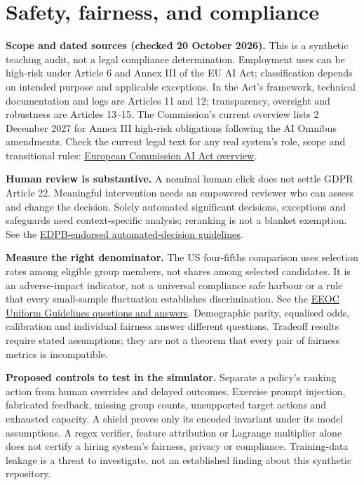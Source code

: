 \documentclass[11pt,oneside]{scrbook}
\begin{document}
\chapter{Safety, fairness, and compliance}

\begin{safetyangle}
\textbf{Scope and dated sources (checked 20 October 2026).}
This is a synthetic teaching audit, not a legal compliance determination.
Employment uses can be high-risk under Article 6 and Annex III of the EU AI
Act; classification depends on intended purpose and applicable exceptions.
In the Act's framework, technical documentation and logs are Articles 11
and 12; transparency, oversight and robustness are Articles 13--15.
The Commission's current overview lists 2 December 2027 for Annex III
high-risk obligations following the AI Omnibus amendments. Check the
current legal text for any real system's role, scope and transitional rules:
\href{https://digital-strategy.ec.europa.eu/en/policies/regulatory-framework-ai}{European Commission AI Act overview}.

\textbf{Human review is substantive.} A nominal human click does not settle
GDPR Article 22. Meaningful intervention needs an empowered reviewer who
can assess and change the decision. Solely automated significant decisions,
exceptions and safeguards need context-specific analysis; reranking is not
a blanket exemption. See the
\href{https://www.edpb.europa.eu/documents/guideline/automated-decision-making-and-profiling_en}{EDPB-endorsed automated-decision guidelines}.

\textbf{Measure the right denominator.} The US four-fifths comparison uses
selection rates among eligible group members, not shares among selected
candidates. It is an adverse-impact indicator, not a universal compliance
safe harbour or a rule that every small-sample fluctuation establishes
discrimination. See the
\href{https://www.eeoc.gov/laws/guidance/questions-and-answers-clarify-and-provide-common-interpretation-uniform-guidelines}{EEOC Uniform Guidelines questions and answers}.
Demographic parity, equalised odds, calibration and individual fairness
answer different questions. Tradeoff results require stated assumptions;
they are not a theorem that every pair of fairness metrics is incompatible.

\textbf{Proposed controls to test in the simulator.} Separate a policy's
ranking action from human overrides and delayed outcomes. Exercise prompt
injection, fabricated feedback, missing group counts, unsupported target
actions and exhausted capacity. A shield proves only its encoded invariant
under its model assumptions. A regex verifier, feature attribution or
Lagrange multiplier alone does not certify a hiring system's fairness,
privacy or compliance. Training-data leakage is a threat to investigate,
not an established finding about this synthetic repository.
\end{safetyangle}
\end{document}
